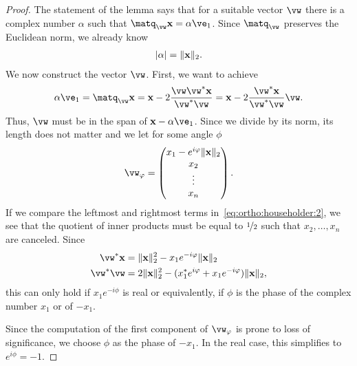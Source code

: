 \begin{proof}
  The statement of the lemma says that for a suitable vector $\vw$ there is a complex number
  $\alpha$ such that $\matq_{\vw} \vx = \alpha \ve_1$. Since
  $\matq_{\vw}$ preserves the Euclidean norm, we already know
  \begin{gather}
    \lvert\alpha\rvert = \lVert\mathbf x\rVert_2.
  \end{gather}
  We now construct the vector $\vw$. First, we want to achieve
  \begin{gather}
    \label{eq:ortho:householder:2}
    \alpha\ve_1 = \matq_{\vw} \vx
    = \vx - 2 \frac{\vw\vw^*\vx}{\vw^*\vw}
    = \vx - 2 \frac{\vw^*\vx}{\vw^*\vw}\vw.
  \end{gather}
  Thus, $\vw$ must be in the span of $\vx-\alpha \ve_1$. Since we divide by
  its norm, its length does not matter and we let for some angle $\phi$
  \begin{gather}
    \vw_\phi =
    \begin{pmatrix}
      x_1 - e^{i\phi} \norm{\vx}_2\\x_2\\\vdots\\x_n
    \end{pmatrix}.
  \end{gather}
  If we compare the leftmost and rightmost terms
  in~\eqref{eq:ortho:householder:2}, we see that the quotient of inner
  products must be equal to $\nicefrac12$ such that $x_2,\dots,x_n$
  are canceled. Since
  \begin{align}
    \vw^*\vx &= \norm{\vx}_2^2 - x_1 e^{-i\phi} \norm{\vx}_2
    \\
    \vw^*\vw &= 2\norm{\vx}_2^2 - (x_1^*e^{i\phi} + x_1 e^{-i\phi})\norm{\vx}_2,
  \end{align}
  this can only hold if $x_1 e^{-i\phi}$ is real or equivalently, if
  $\phi$ is the phase of the complex number $x_1$ or of $-x_1$.

  Since the computation of the first component of $\vw_\phi$ is prone
  to loss of significance, we choose $\phi$ as the phase of $-x_1$. In
  the real case, this simplifies to $e^{i\phi} = -1$.
\end{proof}


